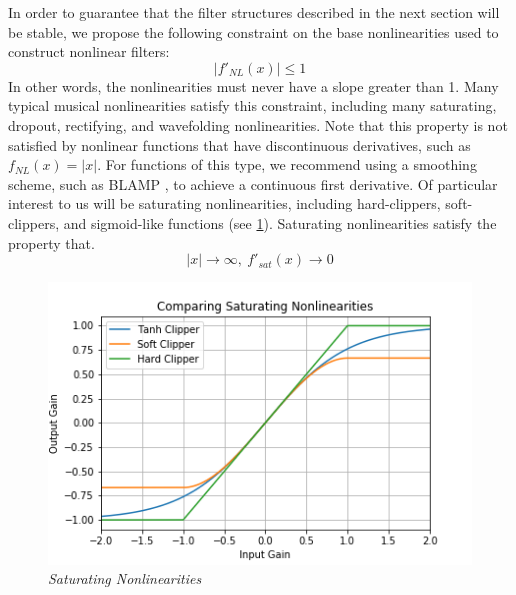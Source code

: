 \documentclass[twoside,a4paper]{article}
\begin{document}
In order to guarantee that the filter structures described in the
next section will be stable, we propose the following constraint
on the base nonlinearities used to construct nonlinear filters:
%
\begin{equation}
    \left| f'_{NL}(x) \right| \leq 1
    \label{eq:NL_constraint}
\end{equation}
%
In other words, the nonlinearities must never have
a slope greater than 1. Many typical musical nonlinearities satisfy
this constraint, including many saturating, dropout, rectifying,
and wavefolding nonlinearities. Note that this property is not satisfied by
nonlinear functions that have discontinuous derivatives, such as
$f_{NL}(x) = |x|$. For functions of this type, we recommend using a
smoothing scheme, such as BLAMP \cite{BLAMP}, to achieve a continuous
first derivative.
\newline\newline
Of particular interest to us will be saturating
nonlinearities, including hard-clippers, soft-clippers,
and sigmoid-like functions (see \cref{Sats}).
Saturating nonlinearities satisfy the property that.
%
\begin{equation}
    |x| \rightarrow \infty, \ f'_{sat}(x) \rightarrow 0
    \label{eq:Sat_constraint}
\end{equation}
%
\begin{figure}[h]
    \center
    \includegraphics[width=\linewidth]{../Pics/Sat-NLs.png}
    \caption{\label{Sats}{\it Saturating Nonlinearities}}
\end{figure}
%
\end{document}
